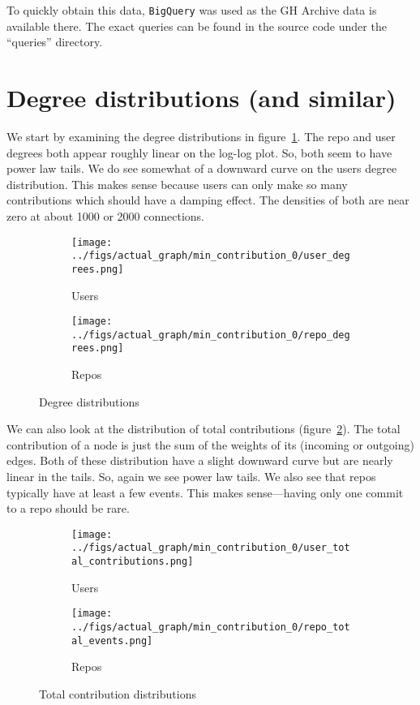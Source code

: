 \documentclass{pset}
\begin{document}
To quickly obtain this data, \texttt{BigQuery} was used as the GH Archive data
is available there.  The exact queries can be found in the source code under
the ``queries'' directory.


\section*{Degree distributions (and similar)}

We start by examining the degree distributions in figure~\ref{fig:degrees}.
The repo and user degrees both appear roughly linear on the log-log plot.  So,
both seem to have power law tails.  We do see somewhat of a downward curve on
the users degree distribution.  This makes sense because users can only make so
many contributions which should have a damping effect.  The densities of both
are near zero at about 1000 or 2000 connections.

\begin{figure}[ht]
\centering
\begin{subfigure}{.5\textwidth}
  \centering
    \texttt{[image: ../figs/actual\_graph/min\_contribution\_0/user\_degrees.png]}
    \caption{Users}
\end{subfigure}%
\begin{subfigure}{.5\textwidth}
  \centering
    \texttt{[image: ../figs/actual\_graph/min\_contribution\_0/repo\_degrees.png]}
    \caption{Repos}
\end{subfigure}
\caption{Degree distributions}\label{fig:degrees}
\end{figure}

We can also look at the distribution of total contributions
(figure~\ref{fig:contributions}). The total contribution of a node is just the
sum of the weights of its (incoming or outgoing) edges.
Both of these distribution have a slight downward curve but are nearly linear
in the tails.  So, again we see power law tails.
We also see that repos typically have at least a few events. 
This makes sense---having only one commit to a repo should be rare.


\begin{figure}[ht]
\centering
\begin{subfigure}{.5\textwidth}
  \centering
    \texttt{[image: ../figs/actual\_graph/min\_contribution\_0/user\_total\_contributions.png]}
    \caption{Users}
\end{subfigure}%
\begin{subfigure}{.5\textwidth}
  \centering
  \texttt{[image: ../figs/actual\_graph/min\_contribution\_0/repo\_total\_events.png]}
    \caption{Repos}
\end{subfigure}
\caption{Total contribution distributions}\label{fig:contributions}
\end{figure}
\end{document}
